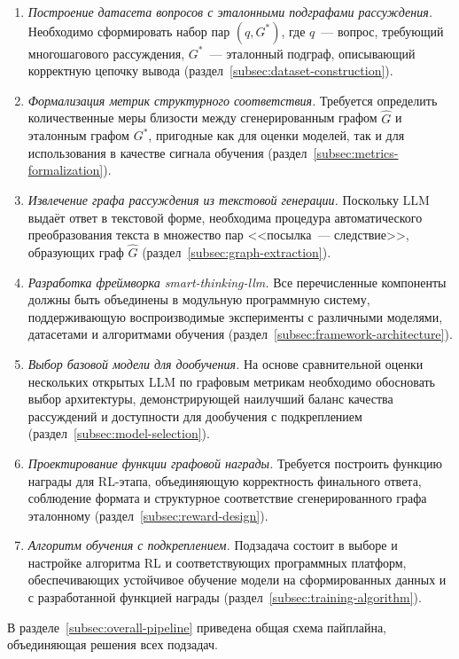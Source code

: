 \begin{enumerate}
    \setlength{\itemsep}{\smallskipamount}
    \item \textit{Построение датасета вопросов с эталонными подграфами рассуждения.} Необходимо сформировать набор пар $(q, G^*)$, где $q$~--- вопрос, требующий многошагового рассуждения, $G^*$~--- эталонный подграф, описывающий корректную цепочку вывода (раздел~\ref{subsec:dataset-construction}).
    \item \textit{Формализация метрик структурного соответствия.} Требуется определить количественные меры близости между сгенерированным графом $\hat{G}$ и эталонным графом $G^*$, пригодные как для оценки моделей, так и для использования в качестве сигнала обучения (раздел~\ref{subsec:metrics-formalization}).
    \item \textit{Извлечение графа рассуждения из текстовой генерации.} Поскольку LLM выдаёт ответ в текстовой форме, необходима процедура автоматического преобразования текста в множество пар <<посылка~--- следствие>>, образующих граф $\hat{G}$ (раздел~\ref{subsec:graph-extraction}).
    \item \textit{Разработка фреймворка smart-thinking-llm.} Все перечисленные компоненты должны быть объединены в модульную программную систему, поддерживающую воспроизводимые эксперименты с различными моделями, датасетами и алгоритмами обучения (раздел~\ref{subsec:framework-architecture}).
    \item \textit{Выбор базовой модели для дообучения.} На основе сравнительной оценки нескольких открытых LLM по графовым метрикам необходимо обосновать выбор архитектуры, демонстрирующей наилучший баланс качества рассуждений и доступности для дообучения с подкреплением (раздел~\ref{subsec:model-selection}).
    \item \textit{Проектирование функции графовой награды.} Требуется построить функцию награды для RL-этапа, объединяющую корректность финального ответа, соблюдение формата и структурное соответствие сгенерированного графа эталонному (раздел~\ref{subsec:reward-design}).
    \item \textit{Алгоритм обучения с подкреплением.} Подзадача состоит в выборе и настройке алгоритма RL и соответствующих программных платформ, обеспечивающих устойчивое обучение модели на сформированных данных и с разработанной функцией награды (раздел~\ref{subsec:training-algorithm}).
\end{enumerate}

В разделе~\ref{subsec:overall-pipeline} приведена общая схема пайплайна, объединяющая решения всех подзадач.

